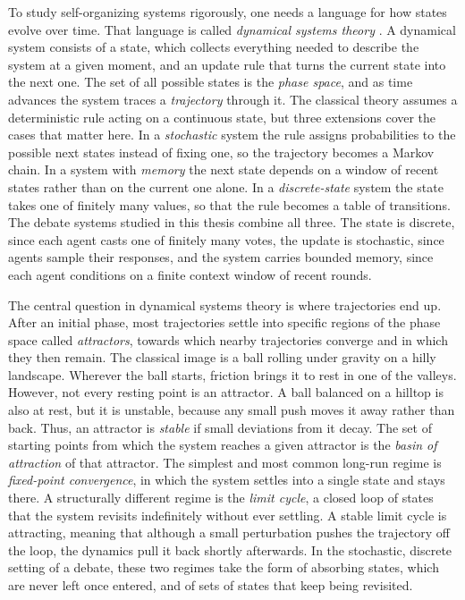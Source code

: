 To study self-organizing systems rigorously, one needs a language for how
states evolve over time. That language is called \emph{dynamical systems theory}
\citep{strogatz2015nonlinear}. A dynamical system consists of a state, which
collects everything needed to describe the system at a given moment, and an
update rule that turns the current state into the next one. The set of all
possible states is the \emph{phase space}, and as time advances the system
traces a \emph{trajectory} through it. The classical theory assumes a
deterministic rule acting on a continuous state, but three extensions cover
the cases that matter here. In a \emph{stochastic} system the rule assigns
probabilities to the possible next states instead of fixing one, so the
trajectory becomes a Markov chain. In a system with \emph{memory} the next
state depends on a window of recent states rather than on the current one
alone. In a \emph{discrete-state} system the state takes one of finitely many
values, so that the rule becomes a table of transitions. The debate systems studied in this thesis combine all three. The
state is discrete, since each agent casts one of finitely many votes, the
update is stochastic, since agents sample their responses, and the system carries
bounded memory, since each agent conditions on a finite context window of recent
rounds.

The central question in dynamical systems theory is where trajectories end up.
After an initial phase, most trajectories settle into specific regions of the
phase space called \emph{attractors}, towards which nearby trajectories
converge and in which they then remain. The classical image is a ball rolling
under gravity on a hilly landscape. Wherever the ball starts, friction brings
it to rest in one of the valleys. However, not every resting point is an attractor. 
A ball balanced on a hilltop is also at rest, but it is unstable,
because any small push moves it away rather than back. Thus, an attractor is
\emph{stable} if small deviations from it decay. The set of starting points from
which the system reaches a given attractor is the \emph{basin of
attraction} of that attractor. The simplest and most common long-run regime is
\emph{fixed-point convergence}, in which the system settles into a single state
and stays there. A structurally different regime is the \emph{limit cycle}, a
closed loop of states that the system revisits indefinitely without ever
settling. A stable limit cycle is attracting, meaning that although a small perturbation pushes the
trajectory off the loop, the dynamics pull it back shortly afterwards. In the
stochastic, discrete setting of a debate, these two regimes take the form of
absorbing states, which are never left once entered, and of sets of states
that keep being revisited.


